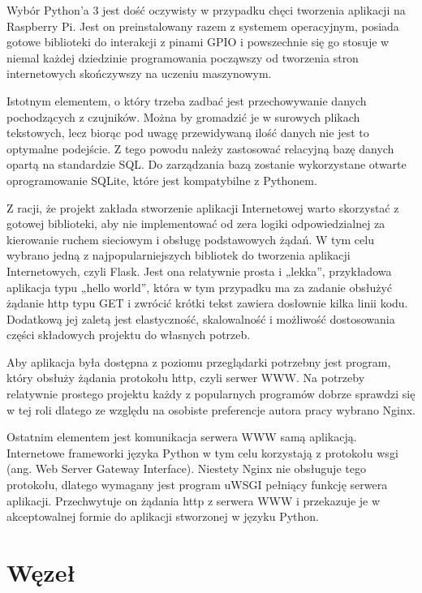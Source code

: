 \documentclass[12pt, twoside, openany]{mwrep}
\begin{document}
\par
Wybór Python’a 3 jest dość oczywisty w przypadku chęci tworzenia aplikacji na Raspberry Pi. Jest on preinstalowany razem z systemem operacyjnym, posiada gotowe biblioteki do interakcji z pinami GPIO i powszechnie się go stosuje w niemal każdej dziedzinie programowania począwszy od tworzenia stron internetowych skończywszy na uczeniu maszynowym. 
\par
Istotnym elementem, o który trzeba zadbać jest przechowywanie danych pochodzących z czujników. Można by gromadzić je w surowych plikach tekstowych, lecz biorąc pod uwagę przewidywaną ilość danych nie jest to optymalne podejście. Z tego powodu należy zastosować relacyjną bazę danych opartą na standardzie SQL. Do zarządzania bazą zostanie wykorzystane otwarte oprogramowanie SQLite, które jest kompatybilne z Pythonem. 
\par
Z racji, że projekt zakłada stworzenie aplikacji Internetowej warto skorzystać z gotowej biblioteki, aby nie implementować od zera logiki odpowiedzialnej za kierowanie ruchem sieciowym i obsługę podstawowych żądań. W tym celu wybrano jedną z najpopularniejszych bibliotek do tworzenia aplikacji Internetowych, czyli Flask. Jest ona relatywnie prosta i „lekka”, przykładowa aplikacja typu „hello world”, która w tym przypadku ma za zadanie obsłużyć żądanie http typu GET i zwrócić krótki tekst zawiera dosłownie kilka linii kodu. Dodatkową jej zaletą jest elastyczność, skalowalność i możliwość dostosowania części składowych projektu do własnych potrzeb.
\par
Aby aplikacja była dostępna z poziomu przeglądarki potrzebny jest program, który obsłuży żądania protokołu http, czyli serwer WWW. Na potrzeby relatywnie prostego projektu każdy z popularnych programów dobrze sprawdzi się w tej roli dlatego ze względu na osobiste preferencje autora pracy wybrano Nginx. 
\par
Ostatnim elementem jest komunikacja serwera WWW samą aplikacją. Internetowe frameworki języka Python w tym celu korzystają z protokołu wsgi (ang.  Web Server Gateway Interface). Niestety Nginx nie obsługuje tego protokołu, dlatego wymagany jest program uWSGI pełniący funkcję serwera aplikacji. Przechwytuje on żądania http z serwera WWW i przekazuje je w akceptowalnej formie do aplikacji stworzonej w języku Python.
\par

\section{Węzeł}
\end{document}
